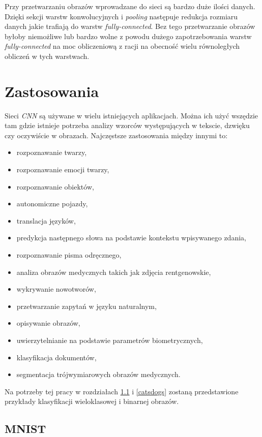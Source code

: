 \documentclass[a4paper,12pt,oneside]{book} %
\begin{document}
Przy przetwarzaniu obrazów wprowadzane do sieci są bardzo duże ilości danych. Dzięki sekcji warstw konwolucyjnych i \emph{pooling} następuje redukcja rozmiaru danych jakie trafiają do warstw \emph{fully-connected}. Bez tego przetwarzanie obrazów byłoby niemożliwe lub bardzo wolne z powodu dużego zapotrzebowania warstw \emph{fully-connected} na moc obliczeniową z racji na obecność wielu równoległych obliczeń w tych warstwach\cite{8308186}. 

\section{Zastosowania}

Sieci \emph{CNN} są używane w wielu istniejących aplikacjach. Można ich użyć wszędzie tam gdzie istnieje potrzeba analizy wzorców występujących w tekscie, dzwięku czy oczywiście w obrazach. Najczęstsze zastosowania między innymi to:
\begin{itemize}
	\item rozpoznawanie twarzy,
	\item rozpoznawanie emocji twarzy,
	\item rozpoznawanie obiektów,
	\item autonomiczne pojazdy,
	\item translacja języków,
	\item predykcja następnego słowa na podstawie kontekstu wpisywanego zdania,
	\item rozpoznawanie pisma odręcznego,
	\item analiza obrazów medycznych takich jak zdjęcia rentgenowskie,
	\item wykrywanie nowotworów,
	\item przetwarzanie zapytań w języku naturalnym,
	\item opisywanie obrazów,
	\item uwierzytelnianie na podstawie parametrów biometrycznych,
	\item klasyfikacja dokumentów,
	\item segmentacja trójwymiarowych obrazów medycznych\cite{cnnapps}.
\end{itemize}

Na potrzeby tej pracy w rozdziałach \ref{mnist} i \ref{catsdogs} zostaną przedstawione przykłady klasyfikacji wieloklasowej i binarnej obrazów.

\subsection{MNIST}
\label{mnist}
\end{document}
